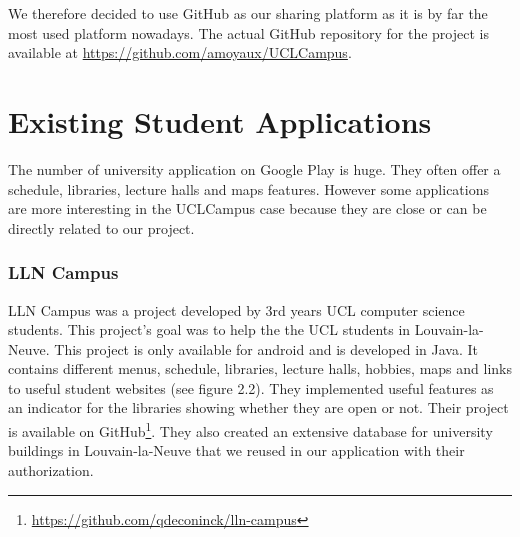 \documentclass{eplmastersthesis}
\begin{document}
We therefore decided to use GitHub as our sharing platform as it is by far the most used platform nowadays.
The actual GitHub repository for the project is available at \url{https://github.com/amoyaux/UCLCampus}.


\section{Existing Student Applications}

The number of university application on Google Play is huge. They often offer a schedule, libraries, lecture halls and maps features. However some applications are more interesting in the UCLCampus case because they are close or can be directly related to our project.  

\subsubsection{LLN Campus}
LLN Campus was a project developed by 3rd years UCL computer science students. This project's goal was to help the the UCL students in Louvain-la-Neuve. This project is only available for android and is developed in Java. It contains different menus, schedule, libraries, lecture halls, hobbies, maps and links to useful student websites (see figure 2.2). They implemented useful features as an indicator for the libraries showing whether they are open or not. Their project is available on GitHub\footnote{\url{https://github.com/qdeconinck/lln-campus}}. They also created an extensive database for university buildings in Louvain-la-Neuve that we reused in our application with their authorization. 
\end{document}
